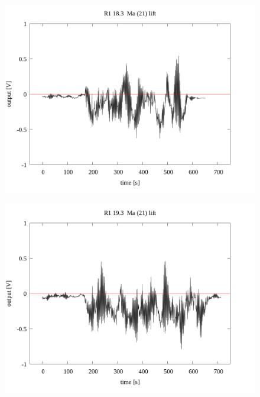 \documentclass[a4paper]{jsarticle}
\begin{document}
\begin{figure}[htbp]
    \footnotesize
    \begin{center}
        \includegraphics[width=140mm]{../../../33_result/210806/moving_average/21/lift/R1_18.6_ma(21)_lift.png}
    \end{center}
\end{figure}

\begin{figure}[htbp]
    \footnotesize
    \begin{center}
        \includegraphics[width=140mm]{../../../33_result/210806/moving_average/21/lift/R1_19.3_ma(21)_lift.png}
    \end{center}
\end{figure}
\end{document}
